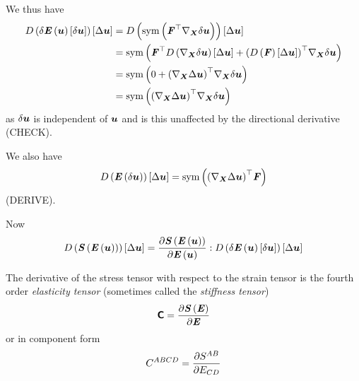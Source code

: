 We thus have
\begin{equation}
  \begin{split}
    \directionalderiv{}{\variation{\fnof{\tensortwo{E}}{\vectr{u}}}{\vectr{u}}}{\linearisationdir{\vectr{u}}}&=
    \directionalderiv{}{\symop\pbrac{\transpose{\tensortwo{F}}\gradient{\vectr{X}}{\variationdir{\vectr{u}}}}}{\linearisationdir{\vectr{u}}}\\
    &=\symop\pbrac{\transpose{\tensortwo{F}}\directionalderiv{}{\gradient{\vectr{X}}{\variationdir{\vectr{u}}}}{\linearisationdir{\vectr{u}}}+
      \transpose{\pbrac{\directionalderiv{}{\tensortwo{F}}{\linearisationdir{\vectr{u}}}}}\gradient{\vectr{X}}{\variationdir{\vectr{u}}}}\\
    &=\symop\pbrac{0+\transpose{\pbrac{\gradient{\vectr{X}}{\linearisationdir{\vectr{u}}}}}\gradient{\vectr{X}}{\variationdir{\vectr{u}}}}\\
    &=\symop\pbrac{\transpose{\pbrac{\gradient{\vectr{X}}{\linearisationdir{\vectr{u}}}}}\gradient{\vectr{X}}{\variationdir{\vectr{u}}}}
  \end{split}
\end{equation}
as $  \delta   \boldsymbol{u}  $ is independent of $ \boldsymbol{u} $ and is this unaffected by
the directional derivative (CHECK).

We also have
\begin{equation}
  \directionalderiv{}{\fnof{\tensortwo{E}}{\variationdir{\vectr{u}}}}{\linearisationdir{\vectr{u}}}=
  \symop\pbrac{\transpose{\pbrac{\gradient{\vectr{X}}{\linearisationdir{\vectr{u}}}}}\tensortwo{F}}
\end{equation}
(DERIVE).

Now
\begin{equation}
  \directionalderiv{}{\fnof{\tensor{S}}{\fnof{\tensor{E}}{\vectr{u}}}}{\linearisationdir{\vectr{u}}}=
  \doubledotprod{\delby{\fnof{\tensor{S}}{\fnof{\tensor{E}}{\vectr{u}}}}{\fnof{\tensor{E}}{\vectr{u}}}}{
    \directionalderiv{}{\variation{\fnof{\tensor{E}}{\vectr{u}}}{\vectr{u}}}{\linearisationdir{\vectr{u}}}}
\end{equation}

The derivative of the stress tensor with respect to the strain tensor is the
fourth order \emph{elasticity tensor} (sometimes called the \emph{stiffness
  tensor}) \ie
\begin{equation}
  \boldsymbol{\mathsf{C}}= \dfrac{\partial  \boldsymbol{\mathit{S}}\left( \boldsymbol{\mathit{E}} \right) }{\partial \boldsymbol{\mathit{E}}} 
\end{equation}
or in component form
\begin{equation}
  C^{ABCD}= \dfrac{\partial S^{AB}}{\partial E_{CD}} 
\end{equation}

